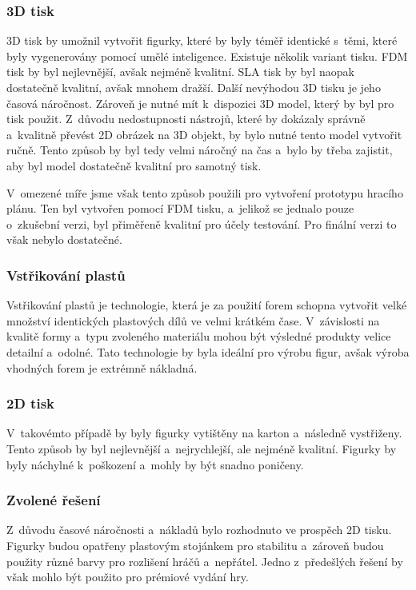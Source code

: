 \subsubsection*{3D tisk}
3D tisk by umožnil vytvořit figurky, které by byly téměř identické s~těmi, které byly vygenerovány pomocí umělé inteligence. Existuje několik variant tisku. FDM tisk by byl nejlevnější, avšak nejméně kvalitní. SLA tisk by byl naopak dostatečně kvalitní, avšak mnohem dražší. Další nevýhodou 3D tisku je jeho časová náročnost. Zároveň je nutné mít k~dispozici 3D model, který by byl pro tisk použit. Z~důvodu nedostupnosti nástrojů, které by dokázaly správně a~kvalitně převést 2D obrázek na 3D objekt, by bylo nutné tento model vytvořit ručně. Tento způsob by byl tedy velmi náročný na čas a~bylo by třeba zajistit, aby byl model dostatečně kvalitní pro samotný tisk.

V~omezené míře jsme však tento způsob použili pro vytvoření prototypu hracího plánu. Ten byl vytvořen pomocí FDM tisku, a~jelikož se jednalo pouze o~zkušební verzi, byl přiměřeně kvalitní pro účely testování. Pro finální verzi to však nebylo dostatečné.

\subsubsection*{Vstřikování plastů}
Vstřikování plastů je technologie, která je za použití forem schopna vytvořit velké množství identických plastových dílů ve velmi krátkém čase. V~závislosti na kvalitě formy a~typu zvoleného materiálu mohou být výsledné produkty velice detailní a~odolné. Tato technologie by byla ideální pro výrobu figur, avšak výroba vhodných forem je extrémně nákladná.

\subsubsection*{2D tisk}
V~takovémto případě by byly figurky vytištěny na karton a~následně vystřiženy. Tento způsob by byl nejlevnější a~nejrychlejší, ale nejméně kvalitní. Figurky by byly náchylné k~poškození a~mohly by být snadno poničeny.

\subsubsection*{Zvolené řešení}
Z~důvodu časové náročnosti a~nákladů bylo rozhodnuto ve prospěch 2D tisku. Figurky budou opatřeny plastovým stojánkem pro stabilitu a~zároveň budou použity různé barvy pro rozlišení hráčů a~nepřátel. Jedno z~předešlých řešení by však mohlo být použito pro prémiové vydání hry.


